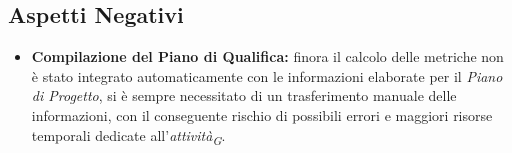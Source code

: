 \subsection{Aspetti Negativi}
\begin{itemize}
    \item \textbf{Compilazione del Piano di Qualifica:} finora il calcolo delle metriche non è stato integrato automaticamente con le informazioni elaborate per il \textit{Piano di Progetto}, si è sempre necessitato di un trasferimento manuale delle informazioni, con il conseguente rischio di possibili errori e maggiori risorse temporali dedicate all'\textit{attività}\textsubscript{\textit{G}}.
\end{itemize}